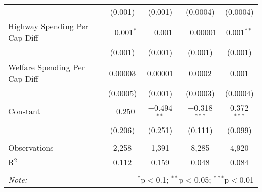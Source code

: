\begin{table}[!htbp]
\begin{tabular}{@{\extracolsep{5pt}}lcccc}
  & (0.001) & (0.001) & (0.0004) & (0.0004) \\ 
  Highway Spending Per Cap Diff & $-$0.001$^{*}$ & $-$0.001 & $-$0.00001 & 0.001$^{**}$ \\ 
  & (0.001) & (0.001) & (0.001) & (0.001) \\ 
  Welfare Spending Per Cap Diff & 0.00003 & 0.00001 & 0.0002 & 0.001 \\ 
  & (0.0005) & (0.001) & (0.0003) & (0.0004) \\ 
  Constant & $-$0.250 & $-$0.494$^{**}$ & $-$0.318$^{***}$ & 0.372$^{***}$ \\ 
  & (0.206) & (0.251) & (0.111) & (0.099) \\ 
 \hline \\[-1.8ex] 
Observations & 2,258 & 1,391 & 8,285 & 4,920 \\ 
R$^{2}$ & 0.112 & 0.159 & 0.048 & 0.084 \\ 
\hline 
\hline \\[-1.8ex] 
\textit{Note:}  & \multicolumn{4}{r}{$^{*}$p$<$0.1; $^{**}$p$<$0.05; $^{***}$p$<$0.01} \\ 
\end{tabular} 
\end{table} 
